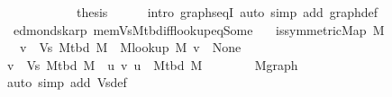 \begin{isabellebody}
\ \ \ \ \ \ \isacommand{{\isachardot}{\kern0pt}}\isamarkupfalse%
\ \isacommand{{\isacharbraceright}{\kern0pt}}\isamarkupfalse%
\isanewline
\ \ \isamarkupfalse%
\ {\isacharquery}{\kern0pt}thesis\isanewline
\ \ \ \ \isamarkupfalse%
\ {\isacharparenleft}{\kern0pt}intro\ graphs{\isacharunderscore}{\kern0pt}eqI{\isacharparenright}{\kern0pt}\ {\isacharparenleft}{\kern0pt}auto\ simp\ add{\isacharcolon}{\kern0pt}\ graph{\isacharunderscore}{\kern0pt}def{\isacharparenright}{\kern0pt}\isanewline
{}\isamarkupfalse%
%
\endisatagproof
{\isafoldproof}%
%
\isadelimproof
\isanewline
%
\endisadelimproof
%
\isadeliminvisible
\isanewline
%
\endisadeliminvisible
%
\isataginvisible
{}\isamarkupfalse%
\ {\isacharparenleft}{\kern0pt}\ edmonds{\isacharunderscore}{\kern0pt}karp{\isacharparenright}{\kern0pt}\ mem{\isacharunderscore}{\kern0pt}Vs{\isacharunderscore}{\kern0pt}M{\isacharunderscore}{\kern0pt}tbd{\isacharunderscore}{\kern0pt}iff{\isacharunderscore}{\kern0pt}lookup{\isacharunderscore}{\kern0pt}eq{\isacharunderscore}{\kern0pt}Some{\isacharcolon}{\kern0pt}\isanewline
\ \ \ {\isachardoublequoteopen}is{\isacharunderscore}{\kern0pt}symmetric{\isacharunderscore}{\kern0pt}Map\ M{\isachardoublequoteclose}\isanewline
\ \ \ {\isachardoublequoteopen}v\ {\isasymnotin}\ Vs\ {\isacharparenleft}{\kern0pt}M{\isacharunderscore}{\kern0pt}tbd\ M{\isacharparenright}{\kern0pt}\ {\isasymlongleftrightarrow}\ M{\isacharunderscore}{\kern0pt}lookup\ M\ v\ {\isacharequal}{\kern0pt}\ None{\isachardoublequoteclose}%
\endisataginvisible
{\isafoldinvisible}%
%
\isadeliminvisible
\isanewline
%
\endisadeliminvisible
%
\isadelimproof
%
\endisadelimproof
%
\isatagproof
{}\isamarkupfalse%
\ {\isacharminus}{\kern0pt}\isanewline
\ \ \isacommand{{\isacharbraceleft}{\kern0pt}}\isamarkupfalse%
\ \isamarkupfalse%
\ {\isachardoublequoteopen}v\ {\isasymin}\ Vs\ {\isacharparenleft}{\kern0pt}M{\isacharunderscore}{\kern0pt}tbd\ M{\isacharparenright}{\kern0pt}\ {\isasymlongleftrightarrow}\ {\isacharparenleft}{\kern0pt}{\isasymexists}u{\isachardot}{\kern0pt}\ {\isacharbraceleft}{\kern0pt}v{\isacharcomma}{\kern0pt}\ u{\isacharbraceright}{\kern0pt}\ {\isasymin}\ M{\isacharunderscore}{\kern0pt}tbd\ M{\isacharparenright}{\kern0pt}{\isachardoublequoteclose}\isanewline
\ \ \ \ \ \ \isamarkupfalse%
\ M{\isachardot}{\kern0pt}graph\isanewline
\ \ \ \ \ \ \isamarkupfalse%
\ {\isacharparenleft}{\kern0pt}auto\ simp\ add{\isacharcolon}{\kern0pt}\ Vs{\isacharunderscore}{\kern0pt}def{\isacharparenright}{\kern0pt}\isanewline

\end{isabellebody}
